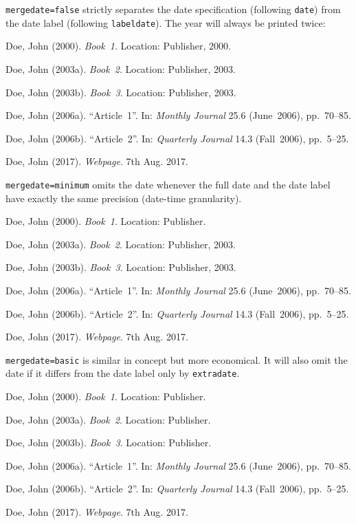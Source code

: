 \documentclass[a4paper]{article}
\newenvironment{bibsample}
  {\trivlist\samepage
   \setlength{\itemsep}{0pt}}
  {\endtrivlist}
\begin{document}
\texttt{mergedate=false} strictly separates the date specification
(following \texttt{date}) from the date label (following \texttt{labeldate}).
The year will always be printed twice:

\begin{bibsample}
\item Doe, John (2000). \emph{Book~1}. Location: Publisher, 2000.
\item Doe, John (2003a). \emph{Book~2}. Location: Publisher, 2003.
\item Doe, John (2003b). \emph{Book~3}. Location: Publisher, 2003.
\item Doe, John (2006a). \enquote{Article~1}. In: \emph{Monthly Journal} 25.6
(June~2006), pp.~70--85.
\item Doe, John (2006b). \enquote{Article~2}. In: \emph{Quarterly Journal} 14.3
(Fall~2006), pp.~5--25.
\item Doe, John (2017). \emph{Webpage}. 7th Aug. 2017.
\end{bibsample}

\texttt{mergedate=minimum} omits the date whenever the full date
and the date label have exactly the same precision (date-time granularity).

\begin{bibsample}
\item Doe, John (2000). \emph{Book~1}. Location: Publisher.
\item Doe, John (2003a). \emph{Book~2}. Location: Publisher, 2003.
\item Doe, John (2003b). \emph{Book~3}. Location: Publisher, 2003.
\item Doe, John (2006a). \enquote{Article~1}. In: \emph{Monthly Journal} 25.6
(June~2006), pp.~70--85.
\item Doe, John (2006b). \enquote{Article~2}. In: \emph{Quarterly Journal} 14.3
(Fall~2006), pp.~5--25.
\item Doe, John (2017). \emph{Webpage}. 7th Aug. 2017.
\end{bibsample}

\texttt{mergedate=basic} is similar in concept but more economical.
It will also omit the date if it differs from the date label only by
\texttt{extradate}.

\begin{bibsample}
\item Doe, John (2000). \emph{Book~1}. Location: Publisher.
\item Doe, John (2003a). \emph{Book~2}. Location: Publisher.
\item Doe, John (2003b). \emph{Book~3}. Location: Publisher.
\item Doe, John (2006a). \enquote{Article~1}. In: \emph{Monthly Journal} 25.6
(June~2006), pp.~70--85.
\item Doe, John (2006b). \enquote{Article~2}. In: \emph{Quarterly Journal} 14.3
(Fall~2006), pp.~5--25.
\item Doe, John (2017). \emph{Webpage}. 7th Aug. 2017.
\end{bibsample}
\end{document}

